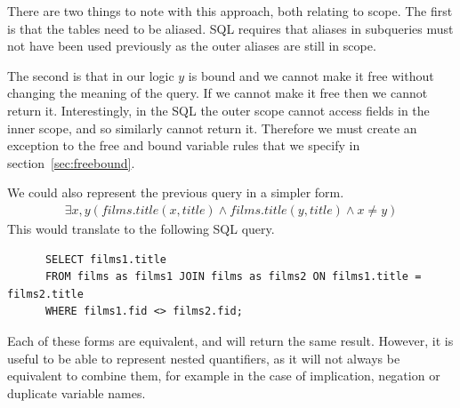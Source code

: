 \documentclass[a4paper, 11pt]{article}
\begin{document}
      There are two things to note with this approach, both relating to scope.
      The first is that the tables need to be aliased. SQL requires that aliases
      in subqueries must not have been used previously as the outer aliases are
      still in scope.

      The second is that in our logic $y$ is bound and we cannot make it free
      without changing the meaning of the query. If we cannot make it free
      then we cannot return it. Interestingly, in the SQL the outer scope cannot
      access fields in the inner scope, and so similarly cannot return it.
      Therefore we must create an exception to the free and bound variable rules
      that we specify in section~\ref{sec:freebound}.

      We could also represent the previous query in a simpler form.
      \begin{gather}
        \exists x,y(films.title(x, title) \land films.title(y, title)
          \land x \neq y)
      \end{gather}
      This would translate to the following SQL query.

      \begin{verbatim}
      SELECT films1.title
      FROM films as films1 JOIN films as films2 ON films1.title = films2.title
      WHERE films1.fid <> films2.fid;
      \end{verbatim}

      Each of these forms are equivalent, and will return the same result.
      However, it is useful to be able to represent nested quantifiers, as it
      will not always be equivalent to combine them, for example in the case
      of implication, negation or duplicate variable names\cite{washEQUIV}.
\end{document}
